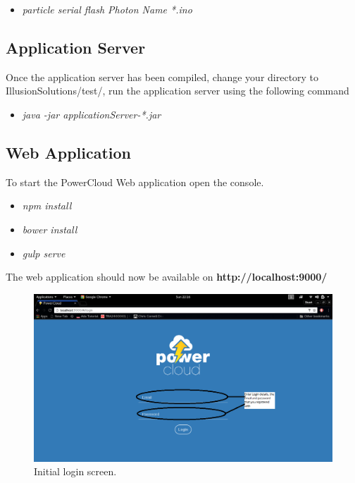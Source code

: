\documentclass[a4paper,10pt]{article}
\begin{document}
	\begin{itemize}
		\item \textit{particle serial flash Photon Name *.ino}
	\end{itemize}
	
	\subsection{Application Server}
	Once the application server has been compiled, change your directory to IllusionSolutions/test/, run the application server using the following command
	
	\begin{itemize}
		\item \textit{java -jar applicationServer-*.jar}
	\end{itemize}
	
	\subsection{Web Application}
	To start the PowerCloud Web application open the console.
	
	\begin{itemize}
		\item \textit{npm install}
		\item \textit{bower install}
		\item \textit{gulp serve}
	\end{itemize}
	
	The web application should now be available on \textbf{http://localhost:9000/}
	
	\begin{figure}[H]
		\includegraphics[width=\textwidth]{images/login.png}
		\caption{Initial login screen. \label{overflow}}
	\end{figure}
	
\end{document}
